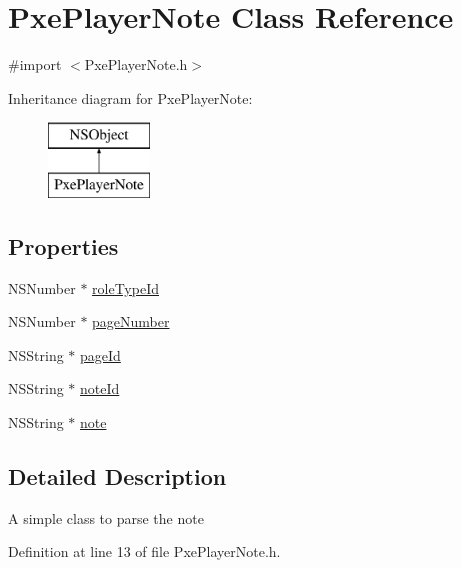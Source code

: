 \hypertarget{interface_pxe_player_note}{\section{Pxe\-Player\-Note Class Reference}
\label{interface_pxe_player_note}
}


{\ttfamily \#import $<$Pxe\-Player\-Note.\-h$>$}

Inheritance diagram for Pxe\-Player\-Note\-:\begin{figure}[H]
\begin{center}
\leavevmode
\includegraphics[height=2.000000cm]{interface_pxe_player_note}
\end{center}
\end{figure}
\subsection*{Properties}
\begin{DoxyCompactItemize}
\item 
N\-S\-Number $\ast$ \hyperlink{interface_pxe_player_note_ae94729dccdfac2f038673a971b74aca2}{role\-Type\-Id}
\item 
N\-S\-Number $\ast$ \hyperlink{interface_pxe_player_note_a3eafbc276f2d28a0c68bc0f2751b9a37}{page\-Number}
\item 
N\-S\-String $\ast$ \hyperlink{interface_pxe_player_note_ae601c2f7024f6c8a478ff0daddb9618b}{page\-Id}
\item 
N\-S\-String $\ast$ \hyperlink{interface_pxe_player_note_a105bbfb4b9f6c08dfb1a1858f511583e}{note\-Id}
\item 
N\-S\-String $\ast$ \hyperlink{interface_pxe_player_note_a07b8365c14b56d5f6bbf991246600880}{note}
\end{DoxyCompactItemize}


\subsection{Detailed Description}
A simple class to parse the note 

Definition at line 13 of file Pxe\-Player\-Note.\-h.



